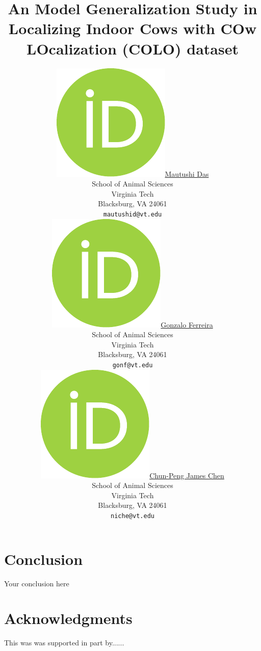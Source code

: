 \documentclass{article}
\title{An Model Generalization Study in Localizing Indoor Cows with COw LOcalization (COLO) dataset}
\author{
    \href{https://orcid.org/0000-0000-0000-0000}{\includegraphics[scale=0.06]{orcid.pdf}\hspace{1mm}Mautushi Das} \\
	School of Animal Sciences\\
	Virginia Tech\\
	Blacksburg, VA 24061 \\
	\texttt{mautushid@vt.edu} \\
	\And
	\href{https://orcid.org/0000-0000-0000-0000}{\includegraphics[scale=0.06]{orcid.pdf}\hspace{1mm}Gonzalo Ferreira} \\
	School of Animal Sciences\\
	Virginia Tech\\
	Blacksburg, VA 24061 \\
	\texttt{gonf@vt.edu} \\
	\And
	\href{https://orcid.org/0000-0000-0000-0000}{\includegraphics[scale=0.06]{orcid.pdf}\hspace{1mm}Chun-Peng James Chen} \\
	School of Animal Sciences\\
	Virginia Tech\\
	Blacksburg, VA 24061 \\
	\texttt{niche@vt.edu}
}
\begin{document}
\maketitle








\section{Conclusion}
Your conclusion here

\section*{Acknowledgments}
This was was supported in part by......




\newpage

\end{document}
